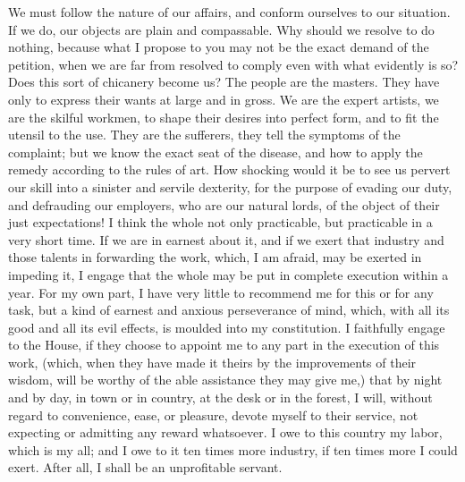 We must follow the nature of our affairs, and conform ourselves to our situation. If we do, our objects are plain and compassable. Why should we resolve to do nothing, because what I propose to you may not be the exact demand of the petition, when we are far from resolved to comply even with what evidently is so? Does this sort of chicanery become us? The people are the masters. They have only to express their wants at large and in gross. We are the expert artists, we are the skilful workmen, to shape their desires into perfect form, and to fit the utensil to the use. They are the sufferers, they tell the symptoms of the complaint; but we know the exact seat of the disease, and how to apply the remedy according to the rules of art. How shocking would it be to see us pervert our skill into a sinister and servile dexterity, for the purpose of evading our duty, and defrauding our employers, who are our natural lords, of the object of their just expectations! I think the whole not only practicable, but practicable in a very short time. If we are in earnest about it, and if we exert that industry and those talents in forwarding the work, which, I am afraid, may be exerted in impeding it, I engage that the whole may be put in complete execution within a year. For my own part, I have very little to recommend me for this or for any task, but a kind of earnest and anxious perseverance of mind, which, with all its good and all its evil effects, is moulded into my constitution. I faithfully engage to the House, if they choose to appoint me to any part in the execution of this work, (which, when they have made it theirs by the improvements of their wisdom, will be worthy of the able assistance they may give me,) that by night and by day, in town or in country, at the desk or in the forest, I will, without regard to convenience, ease, or pleasure, devote myself to their service, not expecting or admitting any reward whatsoever. I owe to this country my labor, which is my all; and I owe to it ten times more industry, if ten times more I could exert. After all, I shall be an unprofitable servant.

